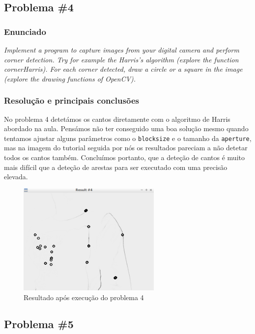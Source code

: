 \documentclass[portuguese, times, mirror]{revdetua}
\begin{document}
\newpage
\subsection{Problema \#4}

\subsubsection{Enunciado}
\textit{Implement a program to capture images from your digital camera and perform corner detection.
Try for example the Harris’s algorithm (explore the function cornerHarris). For each corner
detected, draw a circle or a square in the image (explore the drawing functions of OpenCV).}

\subsubsection{Resolução e principais conclusões}

No problema 4 detetámos os cantos diretamente com o algoritmo de Harris abordado na aula. Pensámos não ter conseguido uma boa solução mesmo quando tentamos ajustar alguns parâmetros como o \texttt{blocksize} e o tamanho da \texttt{aperture}, mas na imagem do tutorial seguida por nós os resultados pareciam a não detetar todos os cantos também. Concluímos portanto, que a deteção de cantos é muito mais difícil que a deteção de arestas para ser executado com uma precisão elevada.

\begin{figure}[ht!]
\centering
\includegraphics[width=70mm]{img/ex4.png}
\caption{Resultado após execução do problema 4}
\end{figure}

\newpage

\subsection{Problema \#5}
\end{document}

